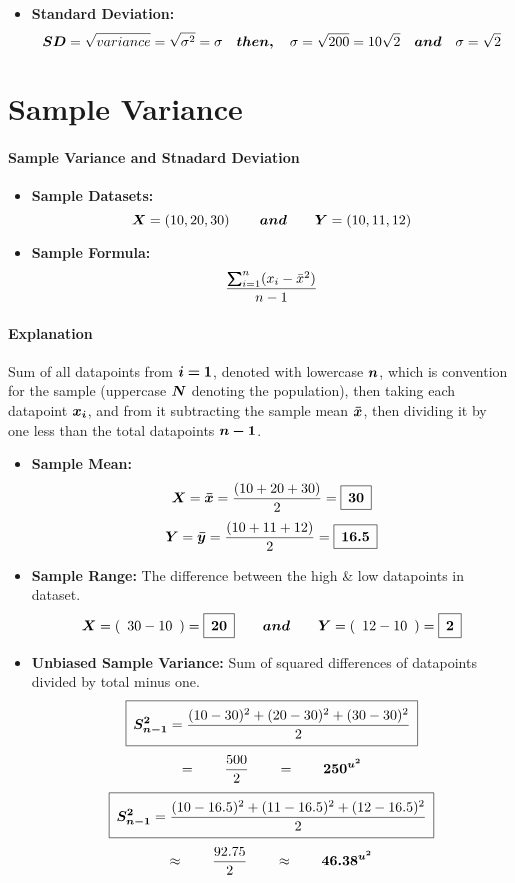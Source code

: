 \documentclass[12pt]{article}
\newcommand\padBox[1]{{\setlength\fboxsep{5pt}\boxed{#1}}}
\newcommand{\negBi}[3][2]{(#2- #3)^{#1}}
\newcommand*{\mB}[1]{\ifmmode\bm{#1}\else\textbf{#1}\fi}
\begin{document}
	\begin{itemize}
		\item\textbf{Standard Deviation:}
			\[
				\mB{SD} = \sqrt{variance} = \sqrt{\sigma^{2}} = \sigma
				\quad\mB{then, }\quad
				\sigma = \sqrt{200} = 10\sqrt{2} \quad\mB{and}\quad \sigma = \sqrt{2}
			\]
	\end{itemize}
\endgroup
\section*{Sample Variance}
\begingroup
	\paragraph{Sample Variance and Stnadard Deviation}%
	\dotfill
	\large
	\begin{itemize}
		\item\textbf{Sample Datasets:}
			\[
				\mB{X}=
				\left(10, 20, 30\right)
				\qquad\mB{and}\qquad
				\mB{Y}=
				\left(10, 11, 12\right)
			\]
		\item\textbf{Sample Formula:}
			\[
				{\frac{\mB{\sum}_{i=1}^{n}(x_{i}-\bar{x}^{2})}{n- 1}}
			\]
	\end{itemize}

\paragraph{Explanation}%

Sum of all datapoints from $\mB{i=1}$, denoted with lowercase $\mB{n}$,
which is convention for the sample (uppercase $\mB{N}$ denoting the
population), then taking each datapoint $\mB{x_{i}}$, and from it
subtracting the sample mean $\mB{\bar{x}}$, then dividing it by one
less than the total datapoints $\mB{n - 1}$.

	\begin{itemize}
		\item\textbf{Sample Mean:}
			\[
				\mB{X}=
				\mB{\bar{x}}=\frac{\left(10 + 20 + 30\right)}{2}=
				\padBox{\mB{30}}
			\]
			\[
				\mB{Y}=
				\mB{\bar{y}}=\frac{\left(10 + 11 + 12\right)}{2}=
				\padBox{\mB{16.5}}
			\]
		\item\textbf{Sample Range: }
			The difference between the high \& low datapoints in dataset.
			\[
				\mB{X}=
				(\enspace30 - 10\enspace) = \padBox{\mB{20}}
				\qquad\mB{and}\qquad
				\mB{Y}=
				(\enspace12 - 10\enspace) = \padBox{\mB{2}}
			\]
		\item\textbf{Unbiased Sample Variance: }
		Sum of squared differences of datapoints divided by total minus one.
			\[\padBox{
				\mB{S_{n-1}^{2}}=\frac{\negBi{10}{30} +
					\negBi{20}{30} +
					\negBi{30}{30}
				}
				{2}
			}\]
			\[=\qquad\frac{500}{2}\qquad=\qquad\mB{250^{u^2}}\]
			\[\padBox{
				\mB{S_{n-1}^{2}}=\frac{\negBi{10}{16.5} +
					\negBi{11}{16.5} +
					\negBi{12}{16.5}
				}
			{2}
			}\]
			\[
				\approx\qquad\frac{92.75}{2}\qquad\approx\qquad\mB{46.38^{u^2}}
			\]
	\end{itemize}
\end{document}
